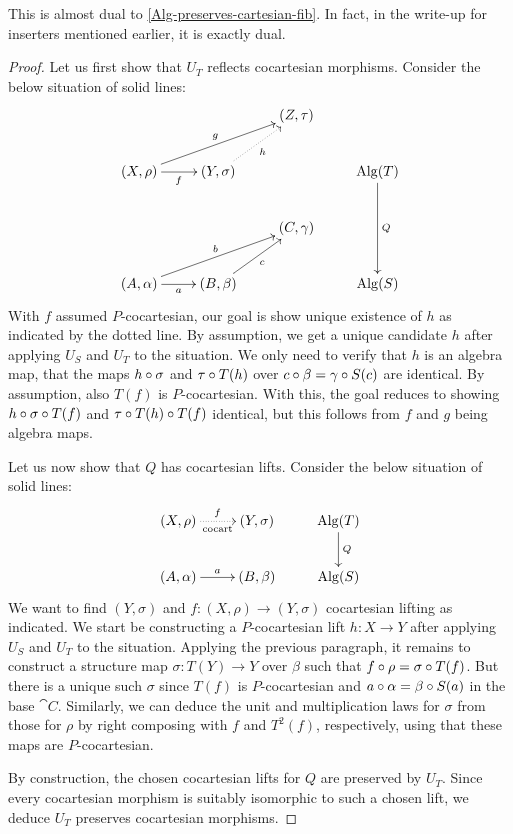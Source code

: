 \documentclass[reqno,10pt,a4paper,oneside]{amsart}
\begin{document}
\begin{remark}
This is almost dual to \cref{Alg-preserves-cartesian-fib}.
In fact, in the write-up for inserters mentioned earlier, it is exactly dual.
\end{remark}

\begin{proof}
Let us first show that $U_T$ reflects cocartesian morphisms.
Consider the below situation of solid lines:
\[
\xymatrix{
&&
  (Z, \tau)
\\
  (X, \rho)
  \ar[r]_{f}
  \ar[urr]^{g}
&
  (Y, \sigma)
  \ar@{.>}[ur]_{h}
&&
  \Alg(T)
  \ar[dd]^{Q}
\\&&
  (C, \gamma)
\\
  (A, \alpha)
  \ar[r]_{a}
  \ar[urr]^{b}
&
  (B, \beta)
  \ar[ur]_{c}
&&
  \Alg(S)
}
\]
With $f$ assumed $P$-cocartesian, our goal is show unique existence of $h$ as indicated by the dotted line.
By assumption, we get a unique candidate $h$ after applying $U_S$ and $U_T$ to the situation.
We only need to verify that $h$ is an algebra map, \ie that the maps $h \mathbin{\circ} \sigma$ and $\tau \mathbin{\circ} T(h)$ over $c \mathbin{\circ} \beta = \gamma \mathbin{\circ} S(c)$ are identical.
By assumption, also $T(f)$ is $P$-cocartesian.
With this, the goal reduces to showing $h \mathbin{\circ} \sigma \mathbin{\circ} T(f)$ and $\tau \mathbin{\circ} T(h) \mathbin{\circ} T(f)$ identical, but this follows from $f$ and $g$ being algebra maps.

Let us now show that $Q$ has cocartesian lifts.
Consider the below situation of solid lines:
\[
\xymatrix{
  (X, \rho)
  \ar@{.>}[r]_{\text{cocart}}^{f}
&
  (Y, \sigma)
&
  \Alg(T)
  \ar[d]^{Q}
\\
  (A, \alpha)
  \ar[r]^{a}
&
  (B, \beta)
&
  \Alg(S)
}
\]
We want to find $(Y, \sigma)$ and $f : (X, \rho) \to (Y, \sigma)$ cocartesian lifting as indicated.
We start be constructing a $P$-cocartesian lift $h : X \to Y$ after applying $U_S$ and $U_T$ to the situation.
Applying the previous paragraph, it remains to construct a structure map $\sigma : T(Y) \to Y$ over $\beta$ such that $f \mathbin{\circ} \rho = \sigma \mathbin{\circ} T(f)$.
But there is a unique such $\sigma$ since $T(f)$ is $P$-cocartesian and $a \mathbin{\circ} \alpha = \beta \mathbin{\circ} S(a)$ in the base $\cat{C}$.
Similarly, we can deduce the unit and multiplication laws for $\sigma$ from those for $\rho$ by right composing with $f$ and $T^2(f)$, respectively, using that these maps are $P$-cocartesian.

By construction, the chosen cocartesian lifts for $Q$ are preserved by $U_T$.
Since every cocartesian morphism is suitably isomorphic to such a chosen lift, we deduce $U_T$ preserves cocartesian morphisms.
\end{proof}
\end{document}
